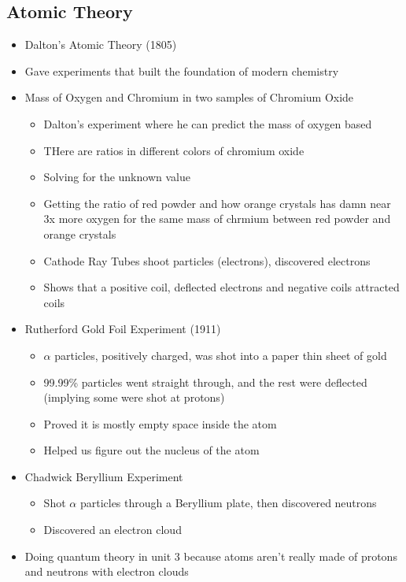 \documentclass{article}
\begin{document}
\subsection{Atomic Theory}
\begin{itemize}
  \item Dalton's Atomic Theory (1805)
  \item Gave experiments that built the foundation of modern chemistry
  \item Mass of Oxygen and Chromium in two samples of Chromium Oxide
    \begin{itemize}
      \item Dalton's experiment where he can predict the mass of oxygen based
      \item THere are ratios in different colors of chromium oxide
      \item Solving for the unknown value
      \item Getting the ratio of red powder and how orange crystals has damn
        near 3x more oxygen for the same mass of chrmium between red powder and orange crystals
      \item Cathode Ray Tubes shoot particles (electrons), discovered electrons
      \item Shows that a positive coil, deflected electrons and negative coils attracted coils
    \end{itemize}
  \item Rutherford Gold Foil Experiment (1911)
    \begin{itemize}
      \item $\alpha{} $ particles, positively charged,
        was shot into a paper thin sheet of gold
      \item 99.99\% particles went straight through, and the rest
        were deflected (implying some were shot at protons)
      \item Proved it is mostly empty space inside the atom
      \item Helped us figure out the nucleus of the atom
    \end{itemize}
  \item Chadwick Beryllium Experiment
    \begin{itemize}
      \item Shot $\alpha{}$ particles through a Beryllium plate,
        then discovered neutrons
      \item Discovered an electron cloud
    \end{itemize}
  \item Doing quantum theory in unit 3 because atoms aren't really made of protons and neutrons with electron clouds
\end{itemize}
\end{document}
